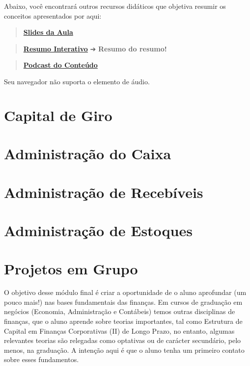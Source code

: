 \documentclass[
  a4paper,
]{book}
\begin{document}
Abaixo, você encontrará outros recursos didáticos que objetiva resumir
os conceitos apresentados por aqui:

\begin{quote}
\href{./resources/intro-ppt.html}{\textbf{Slides da Aula}}
\end{quote}

\begin{quote}
\href{./resources/intro-interativo.html}{\textbf{Resumo Interativo}} ➔
\textbf{Resumo do resumo!} 🥱
\end{quote}

\begin{quote}
\href{resources/intro-podcast.mp3}{\textbf{Podcast do Conteúdo}}
\end{quote}

Seu navegador não suporta o elemento de áudio.


\chapter{Capital de Giro}\label{sec-giro}


\chapter{Administração do Caixa}\label{sec-caixa}


\chapter{Administração de Recebíveis}\label{sec-credito}


\chapter{Administração de Estoques}\label{sec-estoque}


\chapter{Projetos em Grupo}\label{sec-aval}

O objetivo desse módulo final é criar a oportunidade de o aluno
aprofundar (um pouco mais!) nas bases fundamentais das finanças. Em
cursos de graduação em negócios (Economia, Administração e Contábeis)
temos outras disciplinas de finanças, que o aluno aprende sobre teorias
importantes, tal como Estrutura de Capital em Finanças Corporativas (II)
de Longo Prazo, no entanto, algumas relevantes teorias são relegadas
como optativas ou de carácter secundário, pelo menos, na graduação. A
intenção aqui é que o aluno tenha um primeiro contato sobre esses
fundamentos.
\end{document}
